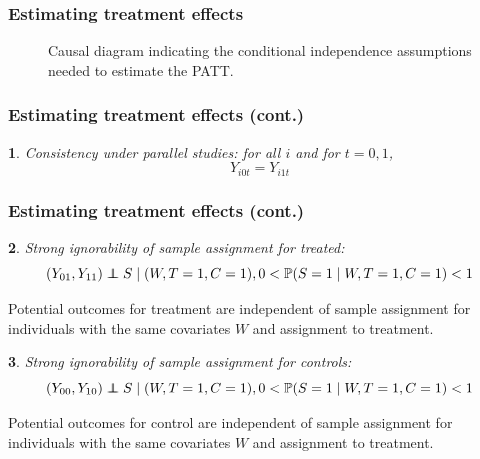\documentclass{beamer}
\makeatletter
\newtheorem*{assumption*}{\assumptionnumber}
\providecommand{\assumptionnumber}{}
\newenvironment{assumption}[2]
 {%
  \renewcommand{\assumptionnumber}{Assumption #1}%
  \begin{assumption*}%
  \protected@edef\@currentlabel{#1}%
 }
 {%
  \end{assumption*}
 }
\newcommand{\pr}{\mathbb{P}} %
\newcommand\independent{\protect\mathpalette{\protect\independenT}{\perp}}
\def\independenT#1#2{\mathrel{\rlap{$#1#2$}\mkern2mu{#1#2}}}
\makeatother
\begin{document}
\begin{frame}
\frametitle{Estimating treatment effects}
\begin{figure}[h]
\centering
{}
\caption{Causal diagram indicating the conditional independence assumptions needed to estimate the PATT.}\label{fig:DAG}
\end{figure}

\end{frame}

\begin{frame}
\frametitle{Estimating treatment effects (cont.)}
\begin{assumption}{1}{}\label{consistency}
Consistency under parallel studies: for all $i$ and for $t=0, 1$,
$$Y_{i0t} = Y_{i1t}$$
\end{assumption}
\end{frame}

\begin{frame}
\frametitle{Estimating treatment effects (cont.)}
\begin{assumption}{2}{}\label{si_treat}
Strong ignorability of sample assignment for treated:
\begin{equation*}
(Y_{01}, Y_{11}) \independent S \mid (W, T=1,C = 1), 0 < \pr(S=1 \mid W, T=1,C = 1) <1 
\end{equation*}
\end{assumption}
\noindent Potential outcomes for treatment are independent of sample assignment for individuals with the same covariates $W$ and assignment to treatment.

\begin{assumption}{3}{}\label{si_ctrl}
Strong ignorability of sample assignment for controls:
\begin{equation*}
(Y_{00}, Y_{10}) \independent S \mid (W, T=1,C = 1), 0 < \pr(S=1 \mid W, T=1,C = 1) <1 
\end{equation*}\end{assumption}

\noindent Potential outcomes for control are independent of sample assignment for individuals with the same covariates $W$ and assignment to treatment.
\end{frame}
\end{document}
